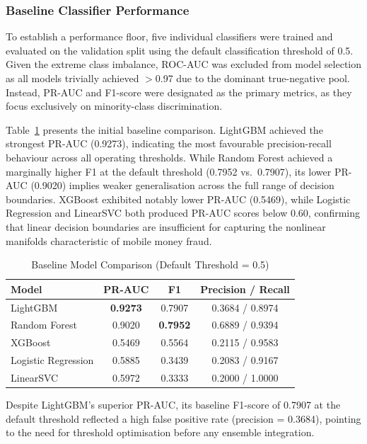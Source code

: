 \documentclass[a4paper,fleqn]{cas-sc}
\begin{document}
\subsubsection{Baseline Classifier Performance}
To establish a performance floor, five individual classifiers were trained and evaluated on the validation split using the default classification threshold of 0.5. Given the extreme class imbalance, ROC-AUC was excluded from model selection as all models trivially achieved $>$0.97 due to the dominant true-negative pool. Instead, PR-AUC and F1-score were designated as the primary metrics, as they focus exclusively on minority-class discrimination.

Table~\ref{tab:initial_comparison} presents the initial baseline comparison. LightGBM achieved the strongest PR-AUC (0.9273), indicating the most favourable precision-recall behaviour across all operating thresholds. While Random Forest achieved a marginally higher F1 at the default threshold (0.7952 vs.\ 0.7907), its lower PR-AUC (0.9020) implies weaker generalisation across the full range of decision boundaries. XGBoost exhibited notably lower PR-AUC (0.5469), while Logistic Regression and LinearSVC both produced PR-AUC scores below 0.60, confirming that linear decision boundaries are insufficient for capturing the nonlinear manifolds characteristic of mobile money fraud.

\begin{table}[H]
\centering
\caption{Baseline Model Comparison (Default Threshold = 0.5)}
\label{tab:initial_comparison}
\small
\begin{tabular}{@{}lccc@{}}
\toprule
\textbf{Model} & \textbf{PR-AUC} & \textbf{F1} & \textbf{Precision / Recall} \\
\midrule
LightGBM            & \textbf{0.9273} & 0.7907 & 0.3684 / 0.8974 \\
Random Forest       & 0.9020 & \textbf{0.7952} & 0.6889 / 0.9394 \\
XGBoost             & 0.5469 & 0.5564 & 0.2115 / 0.9583 \\
Logistic Regression & 0.5885 & 0.3439 & 0.2083 / 0.9167 \\
LinearSVC           & 0.5972 & 0.3333 & 0.2000 / 1.0000 \\
\bottomrule
\end{tabular}
\end{table}

Despite LightGBM's superior PR-AUC, its baseline F1-score of 0.7907 at the default threshold reflected a high false positive rate (precision = 0.3684), pointing to the need for threshold optimisation before any ensemble integration.
\end{document}
